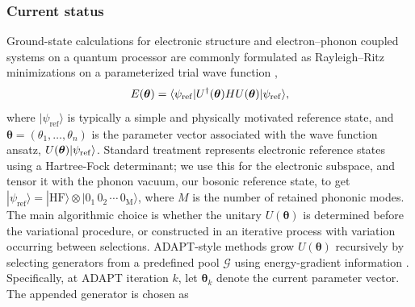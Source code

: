 \documentclass[
  reprint,
  amsmath,
  amssymb,
  aps,
  pra,
  nofootinbib,
  superscriptaddress,
  floatfix
]{revtex4-2}
\newcommand{\ket}[1]{|#1\rangle}
\newcommand{\bra}[1]{\langle #1|}
\begin{document}
\subsubsection{Current status}
Ground-state calculations for electronic structure and electron--phonon coupled systems on a quantum processor are commonly formulated as Rayleigh--Ritz minimizations on a parameterized trial wave function \cite{Peruzzo2014,McClean2016,Kandala2017},
\begin{equation}
E(\boldsymbol{\theta})=
\bra{\psi_{\rm ref}}U^\dagger(\boldsymbol{\theta})HU(\boldsymbol{\theta})\ket{\psi_{\rm ref}},
\label{eq:rayleigh_static}
\end{equation}
where \(\ket{\psi_{\mathrm{ref}}}\) is typically a simple and physically motivated reference state, and $\boldsymbol{\theta}=(\theta_1,\ldots,\theta_n)$ is the parameter vector associated with the wave function ansatz, $U(\boldsymbol{\theta})\ket{\psi_{\rm ref}}$. Standard treatment represents electronic reference states using a Hartree-Fock determinant; we use this for the electronic subspace, and tensor it with the phonon vacuum, our bosonic reference state, to get \(\ket{\psi_{\mathrm{ref}}}=\ket{\mathrm{HF}}\otimes\ket{0_1\,0_2\,\cdots\,0_{\mathrm{M}}}\), where \(M\) is the number of retained phononic modes. The main algorithmic choice is whether the unitary \(U(\boldsymbol{\theta})\) is determined before the variational procedure, or constructed in an iterative process with variation occurring between selections. ADAPT-style methods grow \(U(\boldsymbol{\theta})\) recursively by selecting generators from a predefined pool \(\mathcal{G}\) using energy-gradient information \cite{Grimsley2019,Tang2021,Yordanov2021}. Specifically, at ADAPT iteration \(k\), let \(\boldsymbol{\theta}_k\) denote the current parameter vector. The appended generator is chosen as
\end{document}
